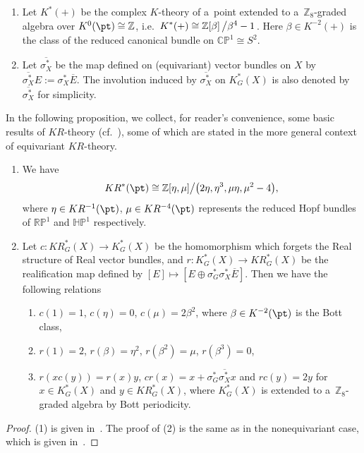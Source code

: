 \begin{Definition}\quad
\begin{enumerate}\itemsep=0pt
\item
Let $K^*(+)$ be the complex $K$-theory of a~point extended to a~$\mathbb{Z}_8$-graded algebra over
$K^0(\pt)\cong\mathbb{Z}$, i.e.\
$\displaystyle K^*(+)\cong\mathbb{Z}[\beta]\left/\beta^4-1\right.$.
Here $\beta\in K^{-2}(+)$ is the class of the reduced canonical bundle on $\mathbb{CP}^1\cong S^2$.
\item
Let $\overline{\sigma_X^*}$ be the map def\/ined on (equivariant) vector bundles on $X$ by $\overline{\sigma_X^*}
E:=
\sigma_X^*\overline{E}$.
The involution induced by $\overline{\sigma_X^*}$ on $K^*_G(X)$ is also denoted by $\overline{\sigma_X^*}$ for simplicity.
\end{enumerate}
\end{Definition}
In the following proposition, we collect, for reader's convenience, some basic results of $KR$-theory
(cf.~\cite[Section~2]{Se}), some of which are stated in the more general context of equivariant $KR$-theory.
\begin{Proposition}\label{krprelim}\quad
\begin{enumerate}\itemsep=0pt
\item[$1.$]
We have
\begin{gather*}
KR^*(\pt)\cong\mathbb{Z}[\eta, \mu]\big/\big(2\eta, \eta^3, \mu\eta, \mu^2-4\big) ,
\end{gather*}
where $\eta\in KR^{-1}(\pt)$, $\mu\in KR^{-4}(\pt)$ represents the reduced Hopf bundles of
$\mathbb{R}\mathbb{P}^1$ and $\mathbb{H}\mathbb{P}^1$ respectively.
\item[$2.$]
Let $c: KR^*_G(X)\to K^*_G(X)$ be the homomorphism which forgets the Real structure of Real vector bundles, and $r:
K^*_G(X)\to KR^*_G(X)$ be the realification map defined by $[E]\mapsto [E\oplus
\sigma_G^*\sigma_X^*\overline{E}
]$.
Then we have the following relations
\begin{enumerate}\itemsep=0pt
\item[$(a)$]
$c(1)=1$, $c(\eta)=0$, $c(\mu)=2\beta^2$, where $\beta\in K^{-2}(\pt)$ is the Bott class,
\item[$(b)$]
$r(1)=2$, $r(\beta)=\eta^2$, $r(\beta^2)=\mu$, $r(\beta^3)=0$,
\item[$(c)$]
$r(xc(y))=r(x)y$, $cr(x)=x+
\sigma_G^*\overline{\sigma_X^*}
x$ and $rc(y)=2y$ for $x\in K^*_G(X)$ and $y\in KR^*_G(X)$, where $K^*_G(X)$ is extended to a~$\mathbb{Z}_8$-graded
algebra by Bott periodicity.
\end{enumerate}
\end{enumerate}
\end{Proposition}
\begin{proof}
(1) is given in~\cite[Section~2]{Se}.
The proof of (2) is the same as in the nonequivariant case, which is given in~\cite{At3}.
\end{proof}

